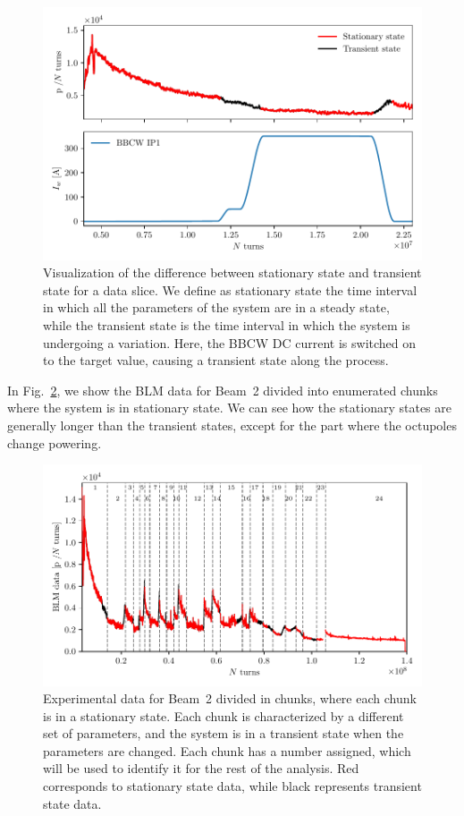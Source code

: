 \begin{figure}[hpt]
    \centering
    \includegraphics[width=1.0\textwidth]{5_wire_compensators_LHC/figs/stationary_transient.pdf}
    \caption{Visualization of the difference between stationary state and transient state for a data slice. We define as stationary state the time interval in which all the parameters of the system are in a steady state, while the transient state is the time interval in which the system is undergoing a variation. Here, the BBCW DC current is switched on to the target value, causing a transient state along the process.}
    \label{fig:transient-state}
\end{figure}

In Fig.~\ref{fig:chunks}, we show the BLM data for Beam~2 divided into enumerated chunks where the system is in stationary state. We can see how the stationary states are generally longer than the transient states, except for the part where the octupoles change powering.

\begin{figure}[hpt]
    \centering
    \includegraphics[width=1.0\textwidth]{5_wire_compensators_LHC/figs/chunks_names.pdf}
    \caption{Experimental data for Beam~2 divided in chunks, where each chunk is in a stationary state. Each chunk is characterized by a different set of parameters, and the system is in a transient state when the parameters are changed. Each chunk has a number assigned, which will be used to identify it for the rest of the analysis. Red corresponds to stationary state data, while black represents transient state data.}
    \label{fig:chunks}
\end{figure}

